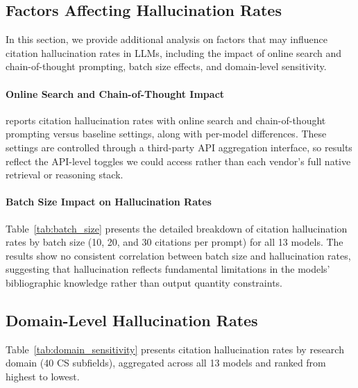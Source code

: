 \subsection{Factors Affecting Hallucination Rates}

In this section, we provide additional analysis on factors that may influence citation hallucination rates in LLMs, including the impact of online search and chain-of-thought prompting, batch size effects, and domain-level sensitivity.

\paragraph{Online Search and Chain-of-Thought Impact}
\label{app:online_impact}

 reports citation hallucination rates with online search and chain-of-thought prompting versus baseline settings, along with per-model differences.
These settings are controlled through a third-party API aggregation interface, so results reflect the API-level toggles we could access rather than each vendor's full native retrieval or reasoning stack.


\paragraph{Batch Size Impact on Hallucination Rates}

% 

\label{app:batch_size}



Table~\ref{tab:batch_size} presents the detailed breakdown of citation hallucination rates by batch size (10, 20, and 30 citations per prompt) for all 13 models.
The results show no consistent correlation between batch size and hallucination rates, suggesting that hallucination reflects fundamental limitations in the models' bibliographic knowledge rather than output quantity constraints.

% 

\subsection{Domain-Level Hallucination Rates}
\label{app:domain_sensitivity}




Table~\ref{tab:domain_sensitivity} presents citation hallucination rates by research domain (40 CS subfields), aggregated across all 13 models and ranked from highest to lowest.

